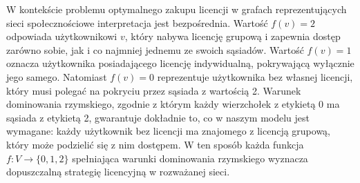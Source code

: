 
W kontekście problemu optymalnego zakupu licencji w grafach reprezentujących sieci społecznościowe interpretacja jest bezpośrednia. Wartość $f(v)=2$ odpowiada użytkownikowi $v$, który nabywa licencję grupową i zapewnia dostęp zarówno sobie, jak i co najmniej jednemu ze swoich sąsiadów. Wartość $f(v)=1$ oznacza użytkownika posiadającego licencję indywidualną, pokrywającą wyłącznie jego samego. Natomiast $f(v)=0$ reprezentuje użytkownika bez własnej licencji, który musi polegać na pokryciu przez sąsiada z wartością 2. Warunek dominowania rzymskiego, zgodnie z którym każdy wierzchołek z etykietą 0 ma sąsiada z etykietą 2, gwarantuje dokładnie to, co w naszym modelu jest wymagane: każdy użytkownik bez licencji ma znajomego z licencją grupową, który może podzielić się z nim dostępem. W ten sposób każda funkcja $f:V \to \{0,1,2\}$ spełniająca warunki dominowania rzymskiego wyznacza dopuszczalną strategię licencyjną w rozważanej sieci.


